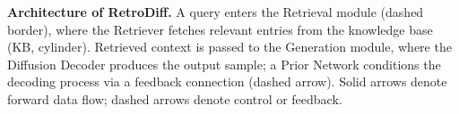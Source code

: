 \caption{\textbf{Architecture of RetroDiff.} A query enters the Retrieval module (dashed border), where the Retriever fetches relevant entries from the knowledge base (KB, cylinder). Retrieved context is passed to the Generation module, where the Diffusion Decoder produces the output sample; a Prior Network conditions the decoding process via a feedback connection (dashed arrow). Solid arrows denote forward data flow; dashed arrows denote control or feedback.}
